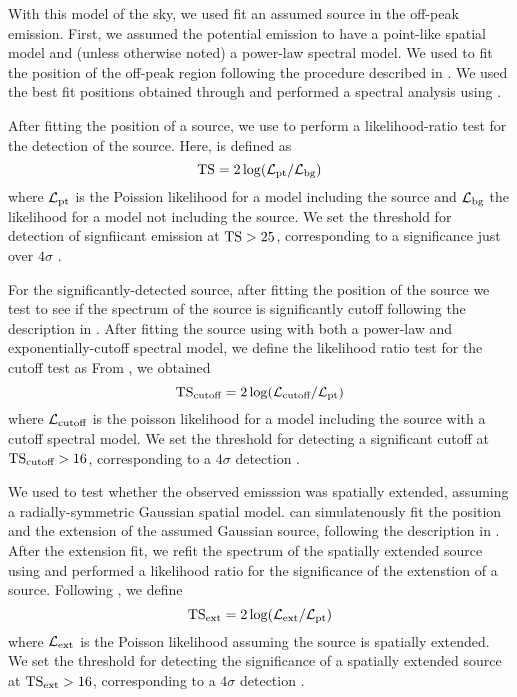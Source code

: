 With this model of the sky, we used fit an assumed source in the off-peak
emission.  First, we assumed the potential emission to have a point-like
spatial model and (unless otherwise noted) a power-law spectral model.
We used \pointlike to fit the position of the off-peak region following
the procedure described in \cite{LAT_Collaboration_2FGL_2012}.  We used
the best fit positions obtained through \pointlike and performed a
spectral analysis using \gtlike.

After fitting the position of a source, we use \gtlike to perform a likelihood-ratio test for
the detection of the source. Here, \ts is defined as
\begin{equation}
  \text{TS} = 2 \log(\mathcal{L}_\text{pt}/\mathcal{L}_\text{bg})
\end{equation}
where $\mathcal{L}_\text{pt}$ is the Poission likelihood for a model including the source and $\mathcal{L}_\text{bg}$
the likelihood for a model not including the source.
We set the threshold for detection of signfiicant emission at $\text{TS}>25$, 
corresponding to a significance just over $4\sigma$ \citep{LAT_Collaboration_1FGL_2010}.

For the significantly-detected source, after fitting the position of the source
we test to see if the spectrum of the source is significantly 
cutoff following the description in 
\cite{LAT_collaboration_PWNCAT_2011}. After fitting the source using \gtlike
with both a power-law and exponentially-cutoff spectral model, we
define the likelihood ratio test for the cutoff test as
From \gtlike, we obtained  
\begin{equation}
  \text{TS}_\text{cutoff}= 2 \log(\mathcal{L}_\text{cutoff}/\mathcal{L}_\text{pt})
\end{equation}
where $\mathcal{L}_\text{cutoff}$ is the poisson likelihood for a model including the source
with a cutoff spectral model.
We set the threshold for detecting a significant cutoff at 
$\text{TS}_\text{cutoff}>16$, corresponding to a $4\sigma$ detection \citep{LAT_collaboration_PWNCAT_2011} .

We used \pointlike to test whether the observed emisssion was
spatially extended, assuming a radially-symmetric Gaussian spatial
model.  \pointlike can simulatenously fit the position and the
extension of the assumed Gaussian source, following the description in
\citep{LAT_collaboration_extended_search_2012}.  After the extension fit,
we refit the spectrum of the spatially extended source using \gtlike
and performed a likelihood ratio for the significance of the extenstion
of a source.  Following \cite{LAT_collaboration_extended_search_2012},
we define
\begin{equation}
  \text{TS}_\text{ext} = 2 \log(\mathcal{L}_\text{ext}/\mathcal{L}_\text{pt})
\end{equation}
where $\mathcal{L}_\text{ext}$ is the Poisson likelihood assuming the
source is spatially extended. We set the threshold for detecting the
significance of a spatially extended source at $\text{TS}_\text{ext}>16$, corresponding
to a $4\sigma$ detection \citep{LAT_collaboration_extended_search_2012}.

